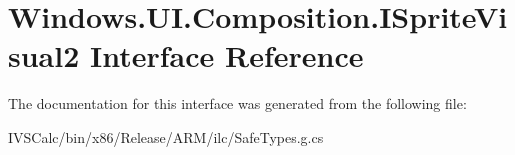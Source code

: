 \hypertarget{interface_windows_1_1_u_i_1_1_composition_1_1_i_sprite_visual2}{}\section{Windows.\+U\+I.\+Composition.\+I\+Sprite\+Visual2 Interface Reference}
\label{interface_windows_1_1_u_i_1_1_composition_1_1_i_sprite_visual2}


The documentation for this interface was generated from the following file\+:\begin{DoxyCompactItemize}
\item 
I\+V\+S\+Calc/bin/x86/\+Release/\+A\+R\+M/ilc/Safe\+Types.\+g.\+cs\end{DoxyCompactItemize}
